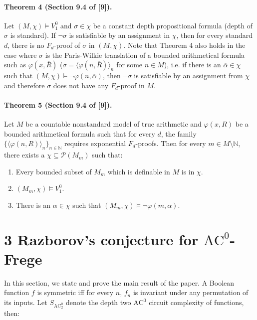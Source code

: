 \paragraph{Theorem 4 (Section 9.4 of [9]).} Let $(M,\chi)\models V_1^0$ and $\sigma\in\chi$ be a constant depth propositional formula (depth of $\sigma$ is standard). If $\neg\sigma$ is satisfiable by an assignment in $\chi$, then for every standard $d$, there is no $F_d$-proof of $\sigma$ in $(M,\chi)$.
Note that Theorem 4 also holds in the case where $\sigma$ is the Paris-Wilkie translation of a bounded arithmetical formula such as $\varphi(x,\overline R)$ ($\sigma=\langle\varphi(n,\overline R)\rangle_n$ for some $n\in M$), i.e. if there is an $\overline\alpha\in\chi$ such that $(M,\chi)\models\neg\varphi(n,\overline\alpha)$, then $\neg\sigma$ is satisfiable by an assignment from $\chi$ and therefore $\sigma$ does not have any $F_d$-proof in $M$.
\paragraph{Theorem 5 (Section 9.4 of [9]).} Let $M$ be a countable nonstandard model of true arithmetic and $\varphi(x,R)$ be a bounded arithmetical formula such that for every $d$, the family $\{\langle\varphi(n,R)\rangle_n\}_{n\in\mathbb N}$ requires exponential $F_d$-proofs. Then for every $m\in M\setminus\mathbb N$, there exists a $\chi\subseteq\mathcal P(M_m)$ such that:
\begin{enumerate}
\item Every bounded subset of $M_m$ which is definable in $M$ is in $\chi$.
\item $(M_m,\chi)\models V_1^0$.
\item There is an $\alpha\in\chi$ such that $(M_m,\chi)\models\neg\varphi(m,\alpha)$.
\end{enumerate}
\section*{3 Razborov's conjecture for $\mathrm{AC}^0$-Frege}
In this section, we state and prove the main result of the paper.
A Boolean function $f$ is symmetric iff for every $n$, $f_n$ is invariant under any permutation of its inputs. Let $S_{\mathrm{AC}_2^0}$ denote the depth two $\mathrm{AC}^0$ circuit complexity of functions, then:
